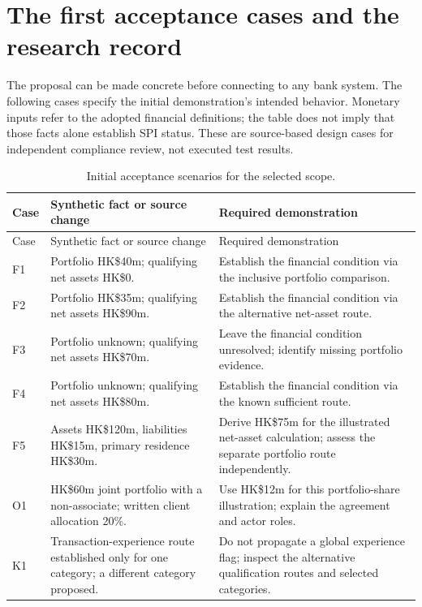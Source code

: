 \section{The first acceptance cases and the research record}
\label{sec:evidence}

The proposal can be made concrete before connecting to any bank system. The
following cases specify the initial demonstration's intended behavior. Monetary
inputs refer to the adopted financial definitions; the table does not imply that
those facts alone establish SPI status. These are source-based design cases for
independent compliance review, not executed test results.

\begingroup\small
\begin{longtable}{P{0.09\textwidth}P{0.41\textwidth}P{0.4\textwidth}}
\caption{Initial acceptance scenarios for the selected scope.}
\label{tab:cases}\\
\toprule Case & Synthetic fact or source change & Required demonstration \\\midrule
\endfirsthead
\toprule Case & Synthetic fact or source change & Required demonstration \\\midrule
\endhead
F1 & Portfolio HK\$40m; qualifying net assets HK\$0. & Establish the financial
condition via the inclusive portfolio comparison.\\
F2 & Portfolio HK\$35m; qualifying net assets HK\$90m. & Establish the financial
condition via the alternative net-asset route.\\
F3 & Portfolio unknown; qualifying net assets HK\$70m. & Leave the financial
condition unresolved; identify missing portfolio evidence.\\
F4 & Portfolio unknown; qualifying net assets HK\$80m. & Establish the financial
condition via the known sufficient route.\\
F5 & Assets HK\$120m, liabilities HK\$15m, primary residence HK\$30m. & Derive
HK\$75m for the illustrated net-asset calculation; assess the separate portfolio
route independently.\\
O1 & HK\$60m joint portfolio with a non-associate; written client allocation 20\%. &
Use HK\$12m for this portfolio-share illustration; explain the agreement and actor roles.\\
K1 & Transaction-experience route established only for one category; a different
category proposed. & Do not propagate a global experience flag; inspect the
alternative qualification routes and selected categories.\\

\end{longtable}
